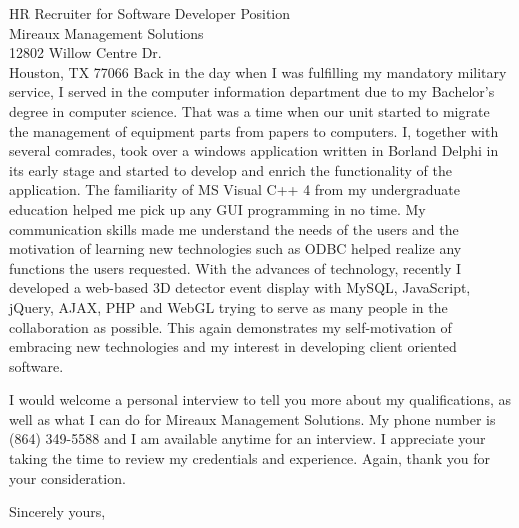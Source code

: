 \documentclass{letter} %
\begin{document}
\begin{letter}{HR Recruiter for Software Developer Position \\
Mireaux Management Solutions \\
12802 Willow Centre Dr. \\
Houston, TX 77066}
\noindent %
Back in the day when I was fulfilling my mandatory military service, I served in the computer information department due to my Bachelor's degree in computer science. That was a time when our unit started to migrate the management of equipment parts from papers to computers. I, together with several comrades, took over a windows application written in Borland Delphi in its early stage and started to develop and enrich the functionality of the application. The familiarity of MS Visual C++ 4 from my undergraduate education helped me pick up any GUI programming in no time. My communication skills made me understand the needs of the users and the motivation of learning new technologies such as ODBC helped realize any functions the users requested. With the advances of technology, recently I developed a web-based 3D detector event display with MySQL, JavaScript, jQuery, AJAX, PHP and WebGL trying to serve as many people in the collaboration as possible. This again demonstrates my self-motivation of embracing new technologies and my interest in developing client oriented software.
 
\noindent %
I would welcome a personal interview to tell you more about my qualifications, as well as what I can do for Mireaux Management Solutions. My phone number is (864) 349-5588 and I am available anytime for an interview. I appreciate your taking the time to review my credentials and experience. Again, thank you for your consideration. 
 
\closing{Sincerely yours,} 
 

 

\end{letter}
 
\end{document}
